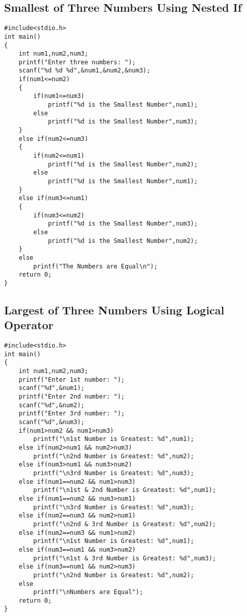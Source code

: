 \documentclass[a4paper,14pt]{article}
\begin{document}
\subsection{Smallest of Three Numbers Using Nested If}
\vspace{0.5cm}
\begin{lstlisting}[caption={Smallest of Three Numbers Using Nested If}]
#include<stdio.h>
int main()
{
    int num1,num2,num3;
    printf("Enter three numbers: ");
    scanf("%d %d %d",&num1,&num2,&num3);
    if(num1<=num2)
    {
        if(num1<=num3)
            printf("%d is the Smallest Number",num1);
        else
            printf("%d is the Smallest Number",num3);
    }
    else if(num2<=num3)
    {
        if(num2<=num1)
            printf("%d is the Smallest Number",num2);
        else
            printf("%d is the Smallest Number",num1);
    }
    else if(num3<=num1)
    {
        if(num3<=num2)
            printf("%d is the Smallest Number",num3);
        else
            printf("%d is the Smallest Number",num2);
    }
    else
        printf("The Numbers are Equal\n");
    return 0;
}
\end{lstlisting}
\newpage

\subsection{Largest of Three Numbers Using Logical Operator}
\vspace{0.5cm}
\begin{lstlisting}[caption={Largest of Three Numbers Using Logical Operator}]
#include<stdio.h>
int main()
{
    int num1,num2,num3;
    printf("Enter 1st number: ");
    scanf("%d",&num1);
    printf("Enter 2nd number: ");
    scanf("%d",&num2);
    printf("Enter 3rd number: ");
    scanf("%d",&num3);
    if(num1>num2 && num1>num3)
        printf("\n1st Number is Greatest: %d",num1);
    else if(num2>num1 && num2>num3)
        printf("\n2nd Number is Greatest: %d",num2);
    else if(num3>num1 && num3>num2)
        printf("\n3rd Number is Greatest: %d",num3);
    else if(num1==num2 && num1>num3)
        printf("\n1st & 2nd Number is Greatest: %d",num1);
    else if(num1==num2 && num3>num1)
        printf("\n3rd Number is Greatest: %d",num3);
    else if(num2==num3 && num2>num1)
        printf("\n2nd & 3rd Number is Greatest: %d",num2);
    else if(num2==num3 && num1>num2)
        printf("\n1st Number is Greatest: %d",num1);
    else if(num3==num1 && num3>num2)
        printf("\n1st & 3rd Number is Greatest: %d",num3);
    else if(num3==num1 && num2>num3)
        printf("\n2nd Number is Greatest: %d",num2);
    else
        printf("\nNumbers are Equal");
    return 0;
}
\end{lstlisting}
\newpage
\end{document}

